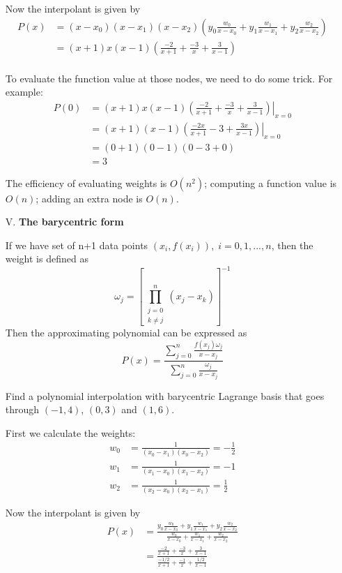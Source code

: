 \begin{enumerate}
\begin{solution}
		Now the interpolant is given by
		\begin{align*}
		P(x) &= (x-x_0)(x-x_1)(x-x_2)\left( y_0\frac{w_0}{x-x_0} + y_1\frac{w_1}{x-x_1} +y_2\frac{w_2}{x-x_2} \right) \\
		&= (x+1)x(x-1) \left(\frac{-2}{x+1} + \frac{-3}{x} +\frac{3}{x-1} \right)\\
		\end{align*}
		
		To evaluate the function value at those nodes, we need to do some trick. For example:
		\begin{align*}
		P(0) &= \left. (x+1)x(x-1) \left(\frac{-2}{x+1} + \frac{-3}{x} +\frac{3}{x-1} \right)\right|_{x=0}\\
		&= \left. (x+1)(x-1) \left(\frac{-2x}{x+1} -3 +\frac{3x}{x-1} \right) \right|_{x=0}\\
		&= (0+1)(0-1) \left(0 -3 + 0 \right)\\
		&= 3
		\end{align*}
	\end{solution}
	The efficiency of evaluating weights is $O(n^2)$; computing a function value is $O(n)$; adding an extra node is $O(n)$.
	
	\item [V.] 
	\textbf{The barycentric form} 
	\begin{thm}
		If we have set of n+1 data points $(x_i,f(x_i)),\;i=0,1,...,n$, then the weight is defined as
		\[ \omega_j = \left[ \prod_{\substack{j=0\\k \neq j}}^n (x_j-x_k) \right]^{-1} \]
		Then the approximating polynomial can be expressed as
		\[P(x) = \frac{\sum_{j=0}^n \frac{f(x_j)\omega_j}{x-x_j}}{\sum_{j=0}^n \frac{\omega_j}{x-x_j}} \]
	\end{thm}
	
	
	
	\begin{ex}
		Find a polynomial interpolation with barycentric Lagrange basis that goes through $(-1,4)$, $(0,3)$ and $(1,6)$.
	\end{ex}
	\begin{solution}
		First we calculate the weights:
		\begin{align*}
		w_0 &= \frac{1}{(x_0-x_1)(x_0-x_2)} = -\frac{1}{2}\\
		w_1 &= \frac{1}{(x_1-x_0)(x_1-x_2)} = -1 \\
		w_2 &= \frac{1}{(x_2-x_0)(x_2-x_1)} = \frac{1}{2}
		\end{align*}
		
		Now the interpolant is given by
		\begin{align*}
		P(x) &= \frac{ y_0\frac{w_0}{x-x_0} + y_1\frac{w_1}{x-x_1} +y_2\frac{w_2}{x-x_2} }{ \frac{w_0}{x-x_0} + \frac{w_1}{x-x_1} + \frac{w_2}{x-x_2} } \\
		&= \frac{ \frac{-2}{x+1} + \frac{-3}{x} +\frac{3}{x-1} }{ \frac{-1/2}{x+1} + \frac{-1}{x} + \frac{1/2}{x-1} }
		\end{align*}
		 

\end{solution}
\end{enumerate}
